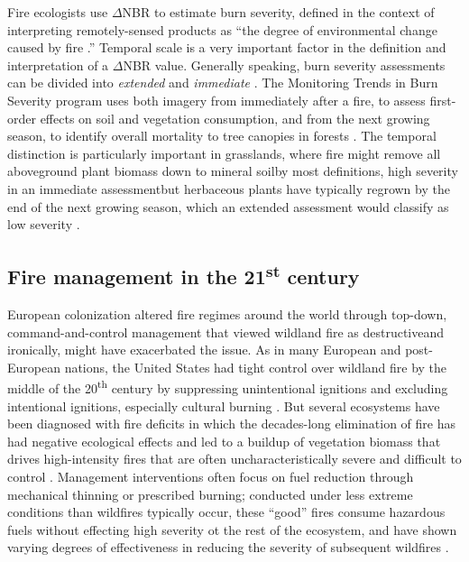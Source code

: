 \documentclass[fire,article,submit,oneauthor,pdftex]{Definitions/mdpi}
\begin{document}
Fire ecologists use $\Delta$NBR to estimate burn severity, defined in the context of interpreting remotely-sensed products as ``the degree of environmental change caused by fire \cite[][p. LA-6]{key2006a}.''
Temporal scale is a very important factor in the definition and interpretation of a $\Delta$NBR value. 
Generally speaking, burn severity assessments can be divided into \emph{extended} and \emph{immediate} \cite{key2006a,veraverbeke2010}.
The Monitoring Trends in Burn Severity program uses both imagery from immediately after a fire, to assess first-order effects on soil and vegetation consumption, and from the next growing season, to identify overall mortality to tree canopies in forests \cite{eidenshink2007a}.
The temporal distinction is particularly important in grasslands, where fire might remove all aboveground plant biomass down to mineral soil\textemdash by most definitions, high severity in an immediate assessment\textemdash but herbaceous plants have typically regrown by the end of the next growing season, which an extended assessment would classify as low severity \cite{lentile2006}. 

\subsection{Fire management in the 21\textsuperscript{st} century}
	
European colonization altered fire regimes around the world through top-down, command-and-control management that viewed wildland fire as destructive\textemdash and ironically, might have exacerbated the issue. 
As in many European and post-European nations, the United States had tight control over wildland fire by the middle of the 20\textsuperscript{th} century by suppressing unintentional ignitions and excluding intentional ignitions, especially cultural burning \cite{mcgranahan2021a, donovan2007}. 
But several ecosystems have been diagnosed with fire deficits in which the decades-long elimination of fire has had negative ecological effects and led to a buildup of vegetation biomass that drives high-intensity fires that are often uncharacteristically severe and difficult to control \cite{parks2015,kolden2019}. 
Management interventions often focus on fuel reduction through mechanical thinning or prescribed burning; conducted under less extreme conditions than wildfires typically occur, these ``good'' fires consume hazardous fuels without effecting high severity ot the rest of the ecosystem, and have shown varying degrees of effectiveness in reducing the severity of subsequent wildfires \cite{fernandes2003, brodie2024}. 
\end{document}
